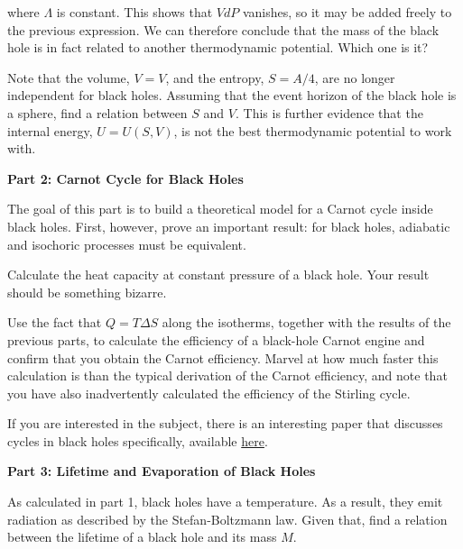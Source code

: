 \documentclass[11pt]{article}
\begin{document}
\begin{pproblem}
\begin{alternativas}
        where \(\Lambda\) is constant. This shows that \(VdP\) vanishes, so it may be added freely to the previous expression. We can therefore conclude that the mass of the black hole is in fact related to another thermodynamic potential. Which one is it?

        \item Note that the volume, \(V=V\), and the entropy, \(S = A/4\), are no longer independent for black holes. Assuming that the event horizon of the black hole is a sphere, find a relation between \(S\) and \(V\). This is further evidence that the internal energy, \(U = U(S, V)\), is not the best thermodynamic potential to work with.
    \end{alternativas}

    \centering
    \textbf{Part 2: Carnot Cycle for Black Holes}
    
    \begin{alternativas}
        \item The goal of this part is to build a theoretical model for a Carnot cycle inside black holes. First, however, prove an important result: for black holes, adiabatic and isochoric processes must be equivalent.
        
        \item Calculate the heat capacity at constant pressure of a black hole. Your result should be something bizarre.
        
        \item Use the fact that \(Q = T \Delta S\) along the isotherms, together with the results of the previous parts, to calculate the efficiency of a black-hole Carnot engine and confirm that you
        obtain the Carnot efficiency. Marvel at how much faster this calculation is than the
        typical derivation of the Carnot efficiency, and note that you have also inadvertently
        calculated the efficiency of the Stirling cycle.

        If you are interested in the subject, there is an interesting paper that discusses cycles in black holes specifically, available \href{https://arxiv.org/pdf/1404.5982}{here}.
    \end{alternativas}

    \centering
    \textbf{Part 3: Lifetime and Evaporation of Black Holes}
    
    \begin{alternativas}
        \item As calculated in part 1, black holes have a temperature. As a result, they emit radiation as described by the Stefan-Boltzmann law. Given that, find a relation between the lifetime of a black hole and its mass \(M\).
    \end{alternativas}

    


\end{pproblem}
\end{document}
